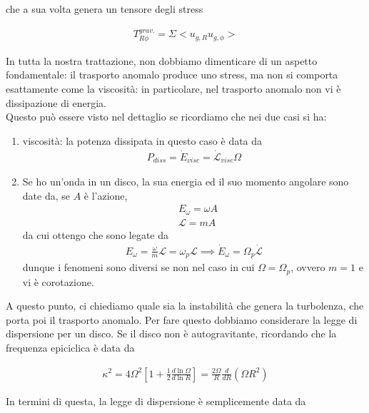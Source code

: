 \documentclass{report}
\begin{document}
che a sua volta genera un tensore degli stress 

\begin{align}
    T_{R\phi}^{grav.} = \Sigma <u_{g, R}u_{g, \phi}>
\end{align}

In tutta la nostra trattazione, non dobbiamo dimenticare di un aspetto fondamentale: il trasporto anomalo produce uno stress, ma non si comporta esattamente come la viscosità: in particolare, nel trasporto anomalo non vi è dissipazione di energia. \\

Questo può essere visto nel dettaglio se ricordiamo che nei due casi si ha: 

\begin{enumerate}
    \item viscosità: la potenza dissipata in questo caso è data da 
    \begin{align}
        P_{diss} = \dot{E}_{visc} = \dot{\mathcal{L}}_{visc}\Omega
    \end{align}
    \item Se ho un'onda in un disco, la sua energia ed il suo momento angolare sono date da, se \(A\) è l'azione, 
    \begin{align}
        &E_{\omega} = \omega A \\
        &\mathcal{L} = mA 
    \end{align}
    da cui ottengo che sono legate da 
    \begin{align}
        E_{\omega} = \frac{\omega}{m}\mathcal{L} = \omega_p \mathcal{L} \implies \dot{E}_{\omega} = \Omega_p \dot{\mathcal{L}}
    \end{align}
    dunque i fenomeni sono diversi se non nel caso in cui \(\Omega = \Omega_p\), ovvero \(m=1\) e vi è corotazione. 
\end{enumerate}

A questo punto, ci chiediamo quale sia la instabilità che genera la turbolenza, che porta poi il trasporto anomalo. Per fare questo dobbiamo considerare la legge di dispersione per un disco. Se il disco non è autogravitante, ricordando che la frequenza epiciclica è data da 

\begin{align}
    \kappa^2 = 4\Omega^2\left[1 + \frac{1}{2}\frac{d\ln \Omega}{d \ln R} \right] = \frac{2\Omega}{R}\frac{d}{dR}(\Omega R^2)
\end{align}

In termini di questa, la legge di dispersione è semplicemente data da 
\end{document}
